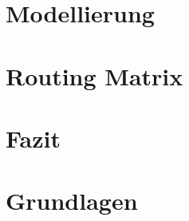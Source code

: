 \documentclass[ngerman,compress,hyperref={bookmarks}]{beamer}
\begin{document}

\section{Modellierung}



\section{Routing Matrix}

\section{Fazit}

\section{Grundlagen}
\end{document}
